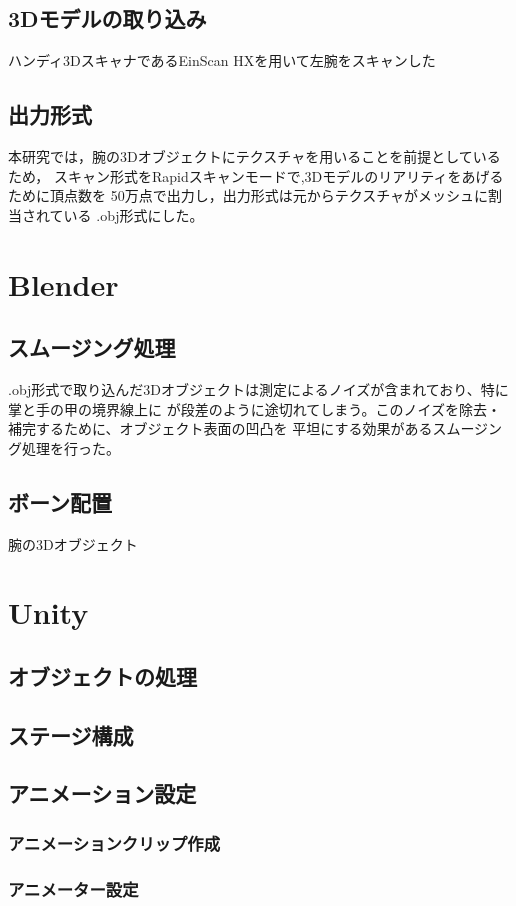 \documentclass{ltjsreport}
\begin{document}
		\subsection{3Dモデルの取り込み}
			ハンディ3DスキャナであるEinScan HXを用いて左腕をスキャンした
		\subsection{出力形式}
			本研究では，腕の3Dオブジェクトにテクスチャを用いることを前提としているため，
			スキャン形式をRapidスキャンモードで,3Dモデルのリアリティをあげるために頂点数を
			50万点で出力し，出力形式は元からテクスチャがメッシュに割当されている
			.obj形式にした。
	\section{Blender}
		\subsection{スムージング処理}
			.obj形式で取り込んだ3Dオブジェクトは測定によるノイズが含まれており、特に掌と手の甲の境界線上に
			が段差のように途切れてしまう。このノイズを除去・補完するために、オブジェクト表面の凹凸を
			平坦にする効果があるスムージング処理を行った。
		\subsection{ボーン配置}
			腕の3Dオブジェクト
	\section{Unity}
		\subsection{オブジェクトの処理}
		\subsection{ステージ構成}
		\subsection{アニメーション設定}
			\subsubsection{アニメーションクリップ作成}
			\subsubsection{アニメーター設定}
\end{document}
